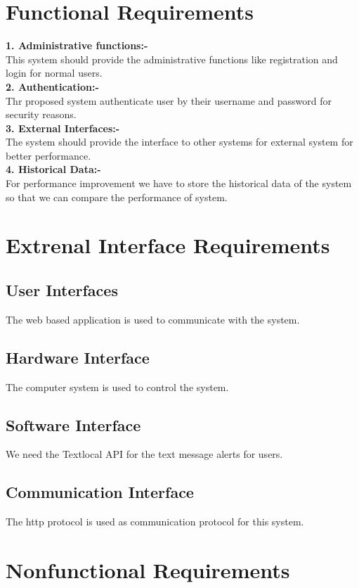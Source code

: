 \documentclass[a4paper,12pt]{report}
\begin{document}
\section{Functional Requirements}
\textbf{1. Administrative functions:-} \\
This system should provide the administrative functions like registration and login for normal users.\\
\textbf{2. Authentication:-} \\
Thr proposed system authenticate user by their username and password for security reasons.\\\newline
\textbf{3. External Interfaces:-} \\
The system should provide the interface to other systems for external system for better performance. \\
\textbf{4. Historical Data:-} \\
For performance improvement we have to store the historical data of the system so that we can compare the performance of system. \\

\section{Extrenal Interface Requirements}
\subsection{User Interfaces}
The web based application is used to communicate with the system.
\subsection{Hardware Interface}
The computer system is used to control the system. 
\subsection{Software Interface}
We need the Textlocal API for the text message alerts for users. 
\subsection{Communication Interface}
The http protocol is used as communication protocol for this system.
\section{Nonfunctional Requirements}
\end{document}
